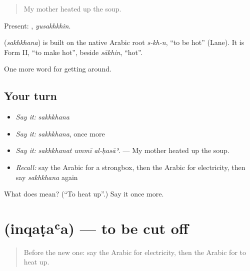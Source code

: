 \begin{quote}
My mother heated up the soup.
\end{quote}

Present: , \emph{yusakhkhin}.

\begin{cousinweb}
\textbf{} (\emph{sakhkhana}) is built on the native Arabic root \emph{s-kh-n}, \textquotedblleft{}to be hot\textquotedblright{} (Lane). It is Form II, \textquotedblleft{}to make hot\textquotedblright{}, beside \emph{sākhin}, \textquotedblleft{}hot\textquotedblright{}.
\end{cousinweb}

\begin{grammarlens}[title={What you've built}]
One more word for getting around.
\end{grammarlens}

\subsection*{Your turn}
\begin{itemize}
\raggedright
  \item \emph{Say it:} \emph{sakhkhana}
  \item \emph{Say it:} \emph{sakhkhana}, once more
  \item \emph{Say it:} \emph{sakhkhanat ummī al-ḥasāʾ.} — My mother heated up the soup.
  \item \emph{Recall:} say the Arabic for a strongbox, then the Arabic for electricity, then say \emph{sakhkhana} again
\end{itemize}

\begin{tcolorbox}[breakable,colback=teal!4,colframe=teal!35!black,title={Before you move on}]
What does  mean? (\textquotedblleft{}To heat up\textquotedblright{}.) Say it once more.
\end{tcolorbox}
\section[\texorpdfstring{\ar{انقطع} (inqaṭaʿa)}{انقطع (inqaṭaʿa)}]{ (inqaṭaʿa) — to be cut off}

\label{lesson:AR-C444-inqataa}



\begin{quote}
Before the new one: say the Arabic for electricity, then the Arabic for to heat up.
\end{quote}

